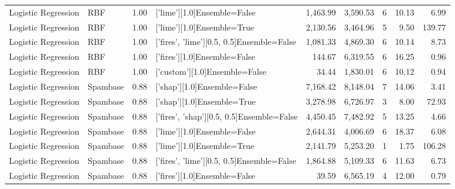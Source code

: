 \begin{tabular}{llrlrrlrr}
Logistic Regression &            RBF &      1.00 &               ['lime'][1.0]Ensemble=False &   1,463.99 &                 3,590.53 &               6 &              10.13 &   6.99 \\
Logistic Regression &            RBF &      1.00 &                ['lime'][1.0]Ensemble=True &   2,130.56 &                 3,464.96 &               5 &               9.50 & 139.77 \\
Logistic Regression &            RBF &      1.00 & ['fires', 'lime'][0.5, 0.5]Ensemble=False &   1,081.33 &                 4,869.30 &               6 &              10.14 &   8.73 \\
Logistic Regression &            RBF &      1.00 &              ['fires'][1.0]Ensemble=False &     144.67 &                 6,319.55 &               6 &              16.25 &   0.96 \\
Logistic Regression &            RBF &      1.00 &             ['custom'][1.0]Ensemble=False &      34.44 &                 1,830.01 &               6 &              10.12 &   0.94 \\
Logistic Regression &       Spambase &      0.88 &               ['shap'][1.0]Ensemble=False &   7,168.42 &                 8,148.04 &               7 &              14.06 &   3.41 \\
Logistic Regression &       Spambase &      0.88 &                ['shap'][1.0]Ensemble=True &   3,278.98 &                 6,726.97 &               3 &               8.00 &  72.93 \\
Logistic Regression &       Spambase &      0.88 & ['fires', 'shap'][0.5, 0.5]Ensemble=False &   4,450.45 &                 7,482.92 &               5 &              13.25 &   4.66 \\
Logistic Regression &       Spambase &      0.88 &               ['lime'][1.0]Ensemble=False &   2,644.31 &                 4,006.69 &               6 &              18.37 &   6.08 \\
Logistic Regression &       Spambase &      0.88 &                ['lime'][1.0]Ensemble=True &   2,141.79 &                 5,253.20 &               1 &               1.75 & 106.28 \\
Logistic Regression &       Spambase &      0.88 & ['fires', 'lime'][0.5, 0.5]Ensemble=False &   1,864.88 &                 5,109.33 &               6 &              11.63 &   6.73 \\
Logistic Regression &       Spambase &      0.88 &              ['fires'][1.0]Ensemble=False &      39.59 &                 6,565.19 &               4 &              12.00 &   0.79 \\

\end{tabular}
